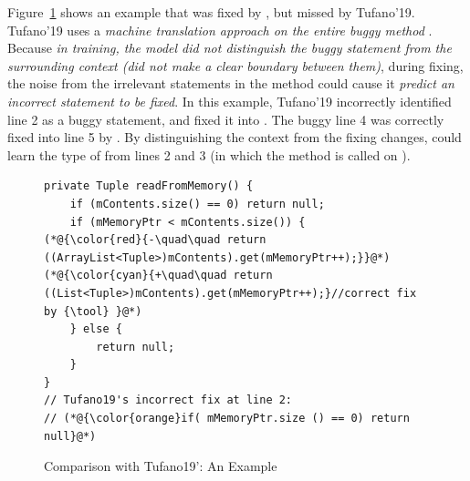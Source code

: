 Figure~\ref{example_tufano19} shows an example that was fixed by
{\tool}, but missed by Tufano'19. Tufano'19 uses a {\em
  machine translation approach on the entire buggy method}
.  Because {\em in training, the model did not
distinguish the buggy statement from the surrounding context (did not
make a clear boundary between them)}, during fixing, the noise from the
irrelevant statements in the method could cause it {\em predict an
  incorrect statement to be fixed}. In this example, Tufano'19
incorrectly identified line 2 as a buggy statement, and fixed it into
  \code{()} \code{==} 
 . The buggy line 4 was correctly fixed into
line 5 by {\tool}. By distinguishing the context from the fixing
changes, {\tool} could learn the type  of 
from lines 2 and 3 (in which the method  is called on
).


\begin{figure}[t]
	\centering
	\begin{lstlisting}[]
private Tuple readFromMemory() {
    if (mContents.size() == 0) return null;
    if (mMemoryPtr < mContents.size()) {
(*@{\color{red}{-\quad\quad return ((ArrayList<Tuple>)mContents).get(mMemoryPtr++);}}@*)
(*@{\color{cyan}{+\quad\quad return ((List<Tuple>)mContents).get(mMemoryPtr++);}//correct fix by {\tool} }@*)
	} else {
        return null;
    }
}
// Tufano19's incorrect fix at line 2:
// (*@{\color{orange}if( mMemoryPtr.size () == 0) return null}@*) 
	\end{lstlisting}
        \vspace{-15pt}
	\caption{Comparison with Tufano19': An Example}
	\label{example_tufano19}
\end{figure}

